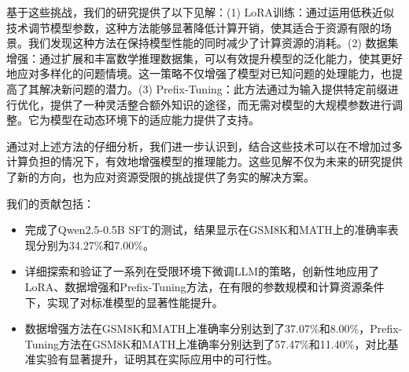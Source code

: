 基于这些挑战，我们的研究提供了以下见解：(1) LoRA训练：通过运用低秩近似技术调节模型参数，这种方法能够显著降低计算开销，使其适合于资源有限的场景。我们发现这种方法在保持模型性能的同时减少了计算资源的消耗。(2) 数据集增强：通过扩展和丰富数学推理数据集，可以有效提升模型的泛化能力，使其更好地应对多样化的问题情境。这一策略不仅增强了模型对已知问题的处理能力，也提高了其解决新问题的潜力。(3) Prefix-Tuning：此方法通过为输入提供特定前缀进行优化，提供了一种灵活整合额外知识的途径，而无需对模型的大规模参数进行调整。它为模型在动态环境下的适应能力提供了支持。

通过对上述方法的仔细分析，我们进一步认识到，结合这些技术可以在不增加过多计算负担的情况下，有效地增强模型的推理能力。这些见解不仅为未来的研究提供了新的方向，也为应对资源受限的挑战提供了务实的解决方案。

我们的贡献包括：  

\begin{itemize}  
    \item 完成了Qwen2.5-0.5B SFT的测试，结果显示在GSM8K和MATH上的准确率表现分别为34.27\%和7.00\%。
    \item 详细探索和验证了一系列在受限环境下微调LLM的策略，创新性地应用了LoRA、数据增强和Prefix-Tuning方法，在有限的参数规模和计算资源条件下，实现了对标准模型的显著性能提升。
    \item 数据增强方法在GSM8K和MATH上准确率分别达到了37.07\%和8.00\%，Prefix-Tuning方法在GSM8K和MATH上准确率分别达到了57.47\%和11.40\%，对比基准实验有显著提升，证明其在实际应用中的可行性。
\end{itemize}